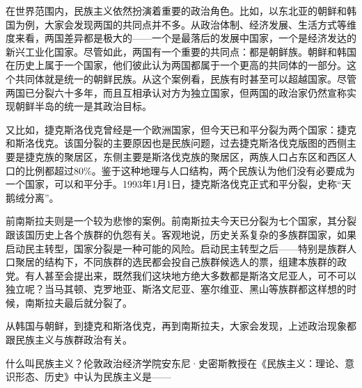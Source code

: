





在世界范围内，民族主义依然扮演着重要的政治角色。比如，以东北亚的朝鲜和韩国为例，大家会发现两国的共同点并不多。从政治体制、经济发展、生活方式等维度来看，两国差异都是极大的——一个是最落后的发展中国家，一个是经济发达的新兴工业化国家。尽管如此，两国有一个重要的共同点：都是朝鲜族。朝鲜和韩国在历史上属于一个国家，他们彼此认为两国都属于一个更高的共同体的一部分。这个共同体就是统一的朝鲜民族。从这个案例看，民族有时甚至可以超越国家。尽管两国已分裂六十多年，而且互相承认对方为独立国家，但两国的政治家仍然宣称实现朝鲜半岛的统一是其政治目标。

又比如，捷克斯洛伐克曾经是一个欧洲国家，但今天已和平分裂为两个国家：捷克和斯洛伐克。该国分裂的主要原因也是民族问题，过去捷克斯洛伐克版图的西侧主要是捷克族的聚居区，东侧主要是斯洛伐克族的聚居区，两族人口占东区和西区人口的比例都超过80\%。鉴于这种地理与人口结构，两个民族认为他们没有必要成为一个国家，可以和平分手。1993年1月1日，捷克斯洛伐克正式和平分裂，史称“天鹅绒分离”。

前南斯拉夫则是一个较为悲惨的案例。前南斯拉夫今天已分裂为七个国家，其分裂跟该国历史上各个族群的仇怨有关。客观地说，历史关系复杂的多族群国家，如果启动民主转型，国家分裂是一种可能的风险。启动民主转型之后——特别是族群人口聚居的结构下，不同族群的选民都会投自己族群候选人的票，组建本族群的政党。有人甚至会提出来，既然我们这块地方绝大多数都是斯洛文尼亚人，可不可以独立呢？当马其顿、克罗地亚、斯洛文尼亚、塞尔维亚、黑山等族群都这样想的时候，南斯拉夫最后就分裂了。

从韩国与朝鲜，到捷克和斯洛伐克，再到南斯拉夫，大家会发现，上述政治现象都跟民族主义与族群政治有关。

什么叫民族主义？伦敦政治经济学院安东尼·史密斯教授在《民族主义：理论、意识形态、历史》中认为民族主义是——

